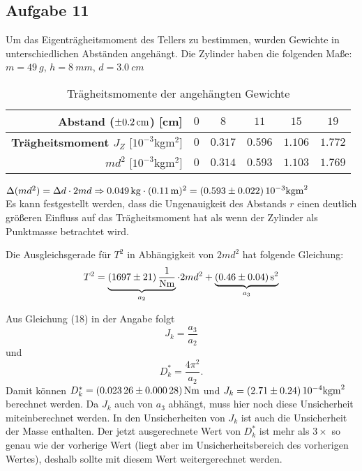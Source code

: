 \documentclass[a4paper, 11pt, ngerman]{scrartcl}
\begin{document}
\subsection{Aufgabe 11}
Um das Eigenträgheitsmoment des Tellers zu bestimmen, wurden Gewichte in unterschiedlichen Abständen angehängt.
Die Zylinder haben die folgenden Maße: $m = \SI{49}{g}$, $h = \SI{8}{mm}$, $d = \SI{3.0}{cm}$
\begin{table}[ht]
\begin{center}\label{tab:Gewichte}
\begin{tabular}{r|ccccc}\hline
\textbf{Abstand} ($\SI{\pm 0.2}{cm}$) [cm] & $0$ & $8$ & $11$ & $15$ & $19$ \\
\hline
\textbf{Trägheitsmoment $J_Z$} [$10^{-3}$kgm$^2$] & $0$ & $0.317$ & $0.596$ & $1.106$ & $1.772$ \\
\textbf{$md^2$} [$10^{-3}$kgm$^2$]                & $0$ & $0.314$ & $0.593$ & $1.103$ & $1.769$ \\
\hline\end{tabular}
\caption{Trägheitsmomente der angehängten Gewichte}
\end{center}
\end{table}

$\Delta (md^2) = \Delta d \cdot 2md \Rightarrow \SI{0.049}{kg} \cdot (\SI{0.11}{m})^2 = \SI{0.593 \pm 0.022}{10^{-3} kgm^2}$\\
Es kann festgestellt werden, dass die Ungenauigkeit des Abstands $r$ einen deutlich größeren Einfluss auf das Trägheitsmoment hat als wenn der Zylinder als Punktmasse betrachtet wird.

Die Ausgleichsgerade für $T^2$ in Abhängigkeit von $2md^2$ hat folgende Gleichung:
\begin{equation}
T^2 = \underbrace{\SI{1697 \pm 21}{1 \over Nm}}_{a_2} \cdot 2md^2 + \underbrace{\SI{0.46 \pm 0.04}{s^2}}_{a_3}
\end{equation}

Aus Gleichung (18) in der Angabe folgt
\begin{equation}
J_k = \frac{a_3}{a_2}
\end{equation}
und
\begin{equation}
D^*_k = \frac{4\pi^2}{a_2}.
\end{equation}
Damit können $D^*_k = \SI{0.02326 \pm 0.00028}{Nm}$ und $J_k = \SI{2.71 \pm 0.24}{10^{-4}kgm^2}$ berechnet werden. Da $J_k$ auch von $a_3$ abhängt, muss hier noch diese Unsicherheit miteinberechnet werden. In den Unsicherheiten von $J_k$ ist auch die Unsicherheit der Masse enthalten. Der jetzt ausgerechnete Wert von $D^*_k$ ist mehr als $3\times$ so genau wie der vorherige Wert (liegt aber im Unsicherheitsbereich des vorherigen Wertes), deshalb sollte mit diesem Wert weitergerechnet werden.
\end{document}
